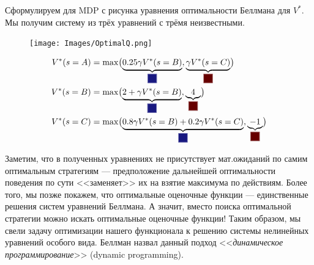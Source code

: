 \begin{exampleBox}[label=ex:optimalvfunction]{}
Сформулируем для MDP с рисунка уравнения оптимальности Беллмана для $V^*$. Мы получим систему из трёх уравнений с трёмя неизвестными.

\begin{figure}
\vspace{-0.2cm}
\centering
\texttt{[image: Images/OptimalQ.png]}
\vspace{-1.3cm}
\end{figure}

\begin{align*} 
V^*(s = A) &= \max \bigl( \underbrace{0.25 \gamma V^*(s = B)}_{\colorsquare{ChadBlue}}, \underbrace{\gamma V^*(s = C)}_{\colorsquare{ChadRed}} \bigr) \\ 
V^*(s = B) &= \max \bigl( \underbrace{2 + \gamma V^*(s = B)}_{\colorsquare{ChadBlue}}, \underbrace{4}_{\colorsquare{ChadRed}} \bigr) \\ 
V^*(s = C) &= \max \bigl( \underbrace{0.8 \gamma V^*(s = B) + 0.2 \gamma V^*(s = C)}_{\colorsquare{ChadBlue}}, \underbrace{-1}_{\colorsquare{ChadRed}} \bigr) \\ 
\end{align*}
\end{exampleBox}

Заметим, что в полученных уравнениях не присутствует мат.ожиданий по самим оптимальным стратегиям --- предположение дальнейшей оптимальности поведения по сути <<заменяет>> их на взятие максимума по действиям. Более того, мы позже покажем, что оптимальные оценочные функции --- единственные решения систем уравнений Беллмана. А значит, вместо поиска оптимальной стратегии можно искать оптимальные оценочные функции! Таким образом, мы свели задачу оптимизации нашего функционала к решению системы нелинейных уравнений особого вида. Беллман назвал данный подход <<\emph{динамическое программирование}>> (dynamic programming).





